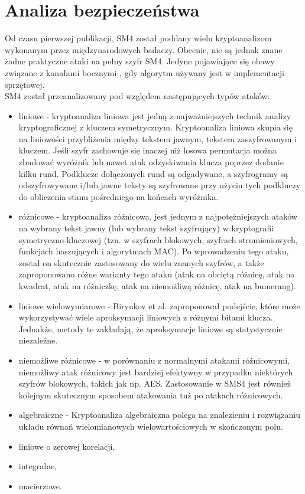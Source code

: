 \section{Analiza bezpieczeństwa}

Od czasu pierwszej publikacji, SM4 został poddany wielu kryptoanalizom wykonanym przez międzynarodowych badaczy. Obecnie, nie są jednak znane żadne praktyczne ataki na pełny szyfr SM4. Jedyne pojawiające się obawy związane z kanałami bocznymi \cite{1}, gdy algorytm używany jest w implementacji sprzętowej. \\

SM4 został przeanalizowany pod względem następujących typów ataków:
\begin{itemize}
    \item liniowe - kryptoanaliza liniowa jest jedną z najważniejszych technik analizy kryptograficznej z kluczem symetrycznym. Kryptoanaliza liniowa skupia się na liniowości przybliżenia między tekstem jawnym, tekstem zaszyfrowanym i kluczem. Jeśli szyfr zachowuje się inaczej niż losowa permutacja można zbudować wyróżnik lub nawet atak odzyskiwania klucza poprzez dodanie kilku rund. Podklucze dołączonych rund są odgadywane, a szyfrogramy są odszyfrowywane i/lub jawne teksty są szyfrowane przy użyciu tych podkluczy do obliczenia stanu pośredniego na końcach wyróżnika.
    \item różnicowe - kryptoanaliza różnicowa, jest jednym z najpotężniejszych ataków na wybrany tekst jawny (lub wybrany tekst szyfrujący) w kryptografii symetryczno-kluczowej (tzn. w szyfrach blokowych, szyfrach strumieniowych, funkcjach haszujących i algorytmach MAC). Po wprowadzeniu tego ataku, został on skutecznie zastosowany do wielu znanych szyfrów, a także zaproponowano różne warianty tego ataku (atak na obciętą różnicę, atak na kwadrat, atak na różniczkę, atak na niemożliwą różnicę, atak na bumerang).
    \item liniowe wielowymiarowe - Biryukov et al. \cite{2} zaproponował podejście, które może wykorzystywać wiele aproksymacji liniowych z różnymi bitami klucza. Jednakże, metody te zakładają, że aproksymacje liniowe są statystycznie niezależne.
    \item niemożliwe różnicowe - w porównaniu z normalnymi atakami różnicowymi, niemożliwy atak różnicowy jest bardziej efektywny w przypadku niektórych szyfrów blokowych, takich jak np. AES. Zastosowanie w SMS4 jest również kolejnym skutecznym sposobem atakowania tuż po atakach różnicowych.
    \item algebraiczne - Kryptoanaliza algebraiczna polega na znalezieniu i rozwiązaniu układu równań wielomianowych wielowartościowych w skończonym polu.
    \item liniowe o zerowej korelacji,
    \item integralne,
    \item macierzowe. \\
\end{itemize} 


